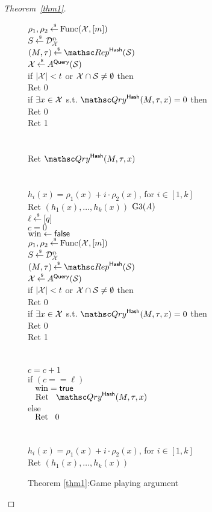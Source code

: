 \begin{proof}[Theorem~\ref{thm1}]
\begin{figure}
{{$\rho_1,\rho_2 {\:\stackrel{{\scriptscriptstyle \hspace{0.2em}\$}} {\leftarrow}\:} \mathrm{Func}({\cal X},[m])$\\
$S {\:\stackrel{{\scriptscriptstyle \hspace{0.2em}\$}} {\leftarrow}\:} \mathcal{D}_{{\cal X}}^{n}$\\
$(M,\tau) \getsr \Rep^{\HashOracle}(\calS)$\\
${\cal X} {\:\stackrel{{\scriptscriptstyle \hspace{0.2em}\$}} {\leftarrow}\:} A^{\mathsf{Query}}({\cal S})$\\
if $|{\cal X}| < t$ or ${\cal X} \cap {\cal S} \neq \emptyset$ then \\
\nudge Ret 0\\
if $\exists x \in {\cal X}$ s.t. $\Qry^{\HashOracle}(M,\tau,x)=0$ then\\
\nudge Ret 0\\
Ret 1\\\\
%
\\
Ret $\Qry^{\HashOracle}(M,\tau,x)$\\\\
%
\\
$h_i(x) = \rho_1(x)+i \cdot \rho_2(x)$, for $i\in[1,k]$\\
Ret $\left(h_1(x),\ldots,h_k(x)\right)$
}
{
\underline{$\text{G3}(A)$}\\
$\ell {\:\stackrel{{\scriptscriptstyle \hspace{0.2em}\$}} {\leftarrow}\:} [q]$\\
$c = 0$ \\%
$\mathrm{win} \gets \mathsf{false}$\\
$\rho_1,\rho_2 {\:\stackrel{{\scriptscriptstyle \hspace{0.2em}\$}} {\leftarrow}\:} \mathrm{Func}({\cal X},[m])$\\
$S {\:\stackrel{{\scriptscriptstyle \hspace{0.2em}\$}} {\leftarrow}\:} \mathcal{D}_{{\cal X}}^{n}$\\
$(M,\tau) \getsr \Rep^{\HashOracle}(\calS)$\\
${\cal X} {\:\stackrel{{\scriptscriptstyle \hspace{0.2em}\$}} {\leftarrow}\:} A^{\mathsf{Query}}({\cal S})$\\
if $|{\cal X}| < t$ or ${\cal X} \cap {\cal S} \neq \emptyset$ then \\
\nudge Ret 0\\
if $\exists x \in {\cal X}$ s.t. $\Qry^{\HashOracle}(M,\tau,x)=0$ then\\
\nudge Ret 0\\
Ret 1\\\\
%
\\
$c=c +1$\\
if $(c == \ell)$\\
$\hspace*{2ex} \mathrm{win} = \mathsf{true}$\\
$\nudge \mathrm{Ret} \nudge \Qry^{\HashOracle}(M,\tau,x)$\\
else \\
$\hspace*{2ex} \mathrm{Ret}\hspace*{2ex} 0$\\\\
%
\\
$h_i(x) = \rho_1(x)+i \cdot \rho_2(x)$, for $i\in[1,k]$\\
Ret $\left(h_1(x),\ldots,h_k(x)\right)$
}
}
\caption{Theorem \ref{thm1}:Game playing argument}\label{fig:Game}
\end{figure}


\end{proof}
